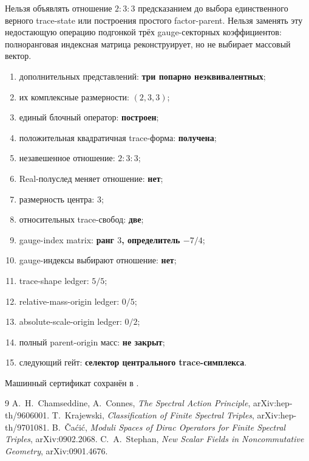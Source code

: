 \begin{nogocriterion}
Нельзя объявлять отношение $2:3:3$ предсказанием до выбора единственного
верного trace-state или построения простого factor-parent. Нельзя заменять
эту недостающую операцию подгонкой трёх gauge-секторных коэффициентов:
полноранговая индексная матрица реконструирует, но не выбирает массовый
вектор.
\end{nogocriterion}

\begin{protocol}\begin{enumerate}
\item дополнительных представлений: \textbf{три попарно неэквивалентных};
\item их комплексные размерности: \textbf{$(2,3,3)$};
\item единый блочный оператор: \textbf{построен};
\item положительная квадратичная trace-форма: \textbf{получена};
\item незавешенное отношение: \textbf{$2:3:3$};
\item Real-полуслед меняет отношение: \textbf{нет};
\item размерность центра: \textbf{$3$};
\item относительных trace-свобод: \textbf{две};
\item gauge-index matrix: \textbf{ранг $3$, определитель $-7/4$};
\item gauge-индексы выбирают отношение: \textbf{нет};
\item trace-shape ledger: \textbf{$5/5$};
\item relative-mass-origin ledger: \textbf{$0/5$};
\item absolute-scale-origin ledger: \textbf{$0/2$};
\item полный parent-origin масс: \textbf{не закрыт};
\item следующий гейт: \textbf{селектор центрального trace-симплекса}.
\end{enumerate}\end{protocol}

Машинный сертификат сохранён в
.

\begin{thebibliography}{9}
A.~H.~Chamseddine, A.~Connes,
\emph{The Spectral Action Principle}, arXiv:hep-th/9606001.
T.~Krajewski,
\emph{Classification of Finite Spectral Triples}, arXiv:hep-th/9701081.
B.~\v{C}a\'ci\'c,
\emph{Moduli Spaces of Dirac Operators for Finite Spectral Triples},
arXiv:0902.2068.
C.~A.~Stephan,
\emph{New Scalar Fields in Noncommutative Geometry}, arXiv:0901.4676.
\end{thebibliography}